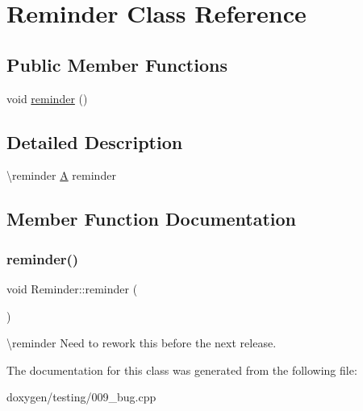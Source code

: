 \hypertarget{class_reminder}{}\section{Reminder Class Reference}
\label{class_reminder}
\subsection*{Public Member Functions}
\begin{DoxyCompactItemize}
\item 
void \mbox{\hyperlink{class_reminder_a173b5218bb11287b0e86a550d9f0728d}{reminder}} ()
\end{DoxyCompactItemize}


\subsection{Detailed Description}
\textbackslash{}reminder \mbox{\hyperlink{class_a}{A}} reminder 

\subsection{Member Function Documentation}
\mbox{\label{class_reminder_a173b5218bb11287b0e86a550d9f0728d}} 
\subsubsection{\texorpdfstring{reminder()}{reminder()}}
{\footnotesize\ttfamily void Reminder\+::reminder (\begin{DoxyParamCaption}{ }\end{DoxyParamCaption})}

\textbackslash{}reminder Need to rework this before the next release. 

The documentation for this class was generated from the following file\+:\begin{DoxyCompactItemize}
\item 
doxygen/testing/009\+\_\+bug.\+cpp\end{DoxyCompactItemize}
